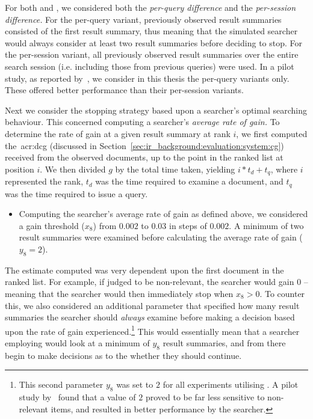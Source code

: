 For both  and , we considered both the \emph{per-query difference} and the \emph{per-session difference.} For the per-query variant, previously observed result summaries consisted of the first result summary, thus meaning that the simulated searcher would always consider at least two result summaries before deciding to stop. For the per-session variant, all previously observed result summaries over the entire search session (i.e. including those from previous queries) were used. In a pilot study, as reported by~\cite{maxwell2015initial_stopping}, we consider in this thesis the per-query variants only. These offered better performance than their per-session variants.

Next we consider the stopping strategy based upon a searcher's optimal searching behaviour. This concerned computing a searcher's \emph{average rate of gain.} To determine the rate of gain at a given result summary at rank $i$, we first computed the~\gls{acr:dcg} (discussed in Section~\ref{sec:ir_background:evaluation:system:cg}) received from the observed documents, up to the point in the ranked list at position $i$. We then divided $g$ by the total time taken, yielding $i * t_d + t_q$, where $i$ represented the rank, $t_d$ was the time required to examine a document, and $t_q$ was the time required to issue a query.

\begin{itemize}
    \item{ Computing the searcher's average rate of gain as defined above, we considered a gain threshold ($x_8$) from $0.002$ to $0.03$ in steps of $0.002$. A minimum of two result summaries were examined before calculating the average rate of gain ($y_8=2$).}
\end{itemize}

The estimate computed was very dependent upon the first document in the ranked list. For example, if judged to be non-relevant, the searcher would gain $0$ -- meaning that the searcher would then immediately stop when $x_8 > 0$. To counter this, we also considered an additional parameter that specified how many result summaries the searcher should \emph{always} examine before making a decision based upon the rate of gain experienced.\footnote{This second parameter $y_8$ was set to $2$ for all experiments utilising . A pilot study by~\cite{maxwell2015stopping_strategies} found that a value of $2$ proved to be far less sensitive to non-relevant items, and resulted in better performance by the searcher.} This would essentially mean that a searcher employing  would look at a minimum of $y_8$ result summaries, and from there begin to make decisions as to the whether they should continue.

